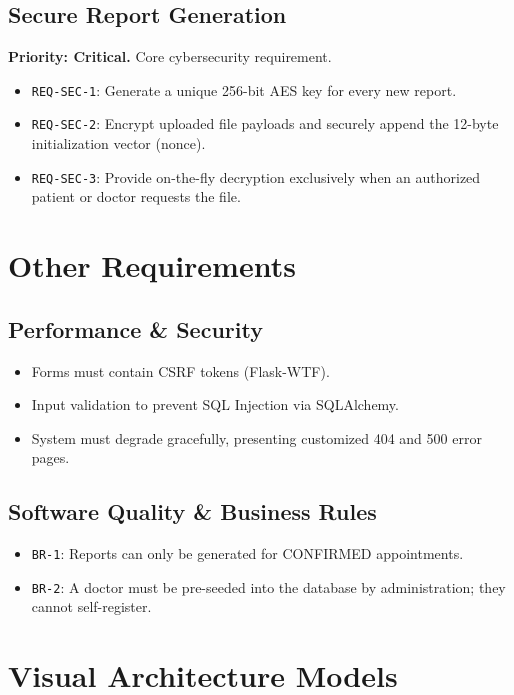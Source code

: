 \documentclass[11pt,a4paper]{article}
\begin{document}
\subsection{Secure Report Generation}
\textbf{Priority: Critical.} Core cybersecurity requirement.
\begin{itemize}[label=--]
    \item \texttt{REQ-SEC-1}: Generate a unique 256-bit AES key for every new report.
    \item \texttt{REQ-SEC-2}: Encrypt uploaded file payloads and securely append the 12-byte initialization vector (nonce).
    \item \texttt{REQ-SEC-3}: Provide on-the-fly decryption exclusively when an authorized patient or doctor requests the file.
\end{itemize}

\section{Other Requirements}

\subsection{Performance \& Security}
\begin{itemize}
    \item Forms must contain CSRF tokens (Flask-WTF).
    \item Input validation to prevent SQL Injection via SQLAlchemy.
    \item System must degrade gracefully, presenting customized 404 and 500 error pages.
\end{itemize}

\subsection{Software Quality \& Business Rules}
\begin{itemize}
    \item \texttt{BR-1}: Reports can only be generated for CONFIRMED appointments.
    \item \texttt{BR-2}: A doctor must be pre-seeded into the database by administration; they cannot self-register.
\end{itemize}

\section{Visual Architecture Models}
\label{sec:models}
\end{document}
